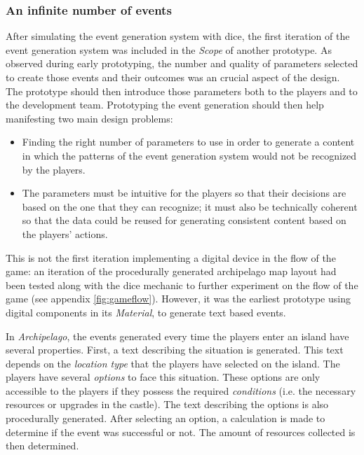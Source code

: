 \subsubsection{An infinite number of events}
After simulating the event generation system with dice, the first iteration of the event generation system was included in the \textit{Scope} of another prototype. As observed during early prototyping, the number and quality of parameters selected to create those events and their outcomes was an crucial aspect of the design. The prototype should then introduce those parameters both to the players and to the development team. Prototyping the event generation should then help manifesting two main design problems:
\begin{itemize}
\item Finding the right number of parameters to use in order to generate a content in which the patterns of the event generation system would not be recognized by the players.
\item The parameters must be intuitive for the players so that their decisions are based on the one that they can recognize; it must also be technically coherent so that the data could be reused for generating consistent content based on the players' actions.
\end{itemize}
This is not the first iteration implementing a digital device in the flow of the game: an iteration of the procedurally generated archipelago map layout had been tested along with the dice mechanic to further experiment on the flow of the game (see appendix \ref{fig:gameflow}). However, it was the earliest prototype using digital components in its \textit{Material}, to generate text based events.

In \textit{Archipelago}, the events generated every time the players enter an island have several properties. First, a text describing the situation is generated. This text depends on the \textit{location type} that the players have selected on the island. The players have several \textit{options} to face this situation. These options are only accessible to the players if they possess the required \textit{conditions} (i.e. the necessary resources or upgrades in the castle). The text describing the options is also procedurally generated. After selecting an option, a calculation is made to determine if the event was successful or not. The amount of resources collected is then determined. 

